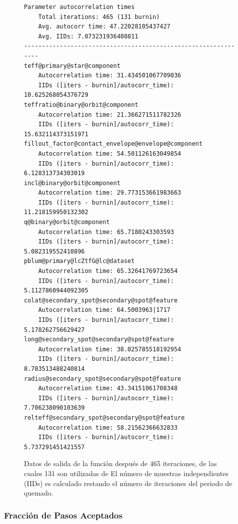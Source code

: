 \begin{figure}[!ht]
	\centering
\begin{lstlisting}
Parameter autocorrelation times 
	Total iterations: 465 (131 burnin) 
	Avg. autocorr time: 47.22028105437427 
	Avg. IIDs: 7.073231936408811
---------------------------------------------------------------
teff@primary@star@component
	Autocorrelation time: 31.434501067709036
	IIDs ([iters - burnin]/autocorr_time): 10.625268054376729
teffratio@binary@orbit@component
	Autocorrelation time: 21.366271511782326
	IIDs ([iters - burnin]/autocorr_time): 15.632114373151971
fillout_factor@contact_envelope@envelope@component
	Autocorrelation time: 54.501126163049854
	IIDs ([iters - burnin]/autocorr_time): 6.128313734303019
incl@binary@orbit@component
	Autocorrelation time: 29.773153661983663
	IIDs ([iters - burnin]/autocorr_time): 11.218159950132302
q@binary@orbit@component
	Autocorrelation time: 65.7180243303593
	IIDs ([iters - burnin]/autocorr_time): 5.082319552410896
pblum@primary@lcZtfG@lc@dataset
	Autocorrelation time: 65.32641769723654
	IIDs ([iters - burnin]/autocorr_time): 5.1127860944092305
colat@secondary_spot@secondary@spot@feature
	Autocorrelation time: 64.5003963|1717
	IIDs ([iters - burnin]/autocorr_time): 5.178262756629427
long@secondary_spot@secondary@spot@feature
	Autocorrelation time: 38.025785518192954
	IIDs ([iters - burnin]/autocorr_time): 8.783513488240814
radius@secondary_spot@secondary@spot@feature
	Autocorrelation time: 43.34151061708348
	IIDs ([iters - burnin]/autocorr_time): 7.706238090103639
relteff@secondary_spot@secondary@spot@feature
	Autocorrelation time: 58.21562366632833
	IIDs ([iters - burnin]/autocorr_time): 5.737291451421557
\end{lstlisting}
	\caption{Datos de salida de la función 
	después de 465 iteraciones, de las cuales 131 son utilizadas de
	 El número de muestras independientes (IIDs) es calculado
	restando el número de iteraciones del periodo de quemado.}
	\label{codigoParamAutoCorrSalida}
\end{figure}

\subsubsection{Fracción de Pasos Aceptados}

